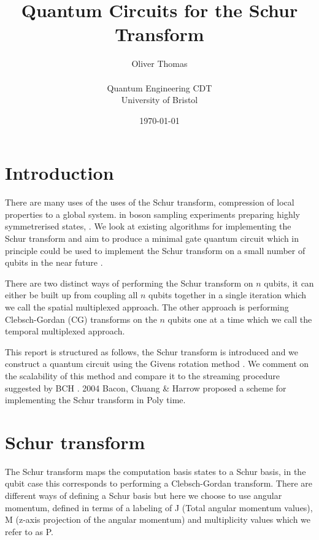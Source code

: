 \documentclass[12pt]{article}
\begin{document}

    \title{Quantum Circuits for the Schur Transform}
    \author{Oliver Thomas \\[0.5em] \\ Quantum Engineering CDT \\ University of Bristol}
    \date{\today}
    \maketitle


\section{Introduction}

There are many uses of the uses of the Schur transform, compression of local properties to a global system. in boson sampling experiments preparing highly symmetrerised states, \cite{moylett2018quantum}. 
We look at existing algorithms for implementing the Schur transform and aim to produce a minimal gate quantum circuit which in principle could be used to implement the Schur transform on a small number of qubits in the near future \cite{kirby2017practical}.

There are two distinct ways of performing the Schur transform on $n$ qubits, it can either be built up from coupling all $n$ qubits together in a single iteration which we call the spatial multiplexed approach. The
other approach is performing Clebsch-Gordan (CG) transforms on the $n$ qubits one at a time which we call the temporal multiplexed approach.  

This report is structured as follows, the Schur transform is introduced and we construct a quantum circuit using the Givens rotation method \cite{li2013decomposition}. We comment on the scalability of this method and compare it to the streaming procedure suggested by BCH \cite{bacon2006efficient}. 2004 Bacon, Chuang \& Harrow proposed a scheme for implementing the Schur transform in Poly time. 

\section{Schur transform}

The Schur transform maps the computation basis states to a Schur basis, in the qubit case this corresponds to performing a Clebsch-Gordan transform. There are different ways of defining a Schur basis but here we choose to use angular momentum, defined in terms of a labeling of J (Total angular momentum values), M (z-axis projection of the angular momentum) and multiplicity values which we refer to as P.
\end{document}
